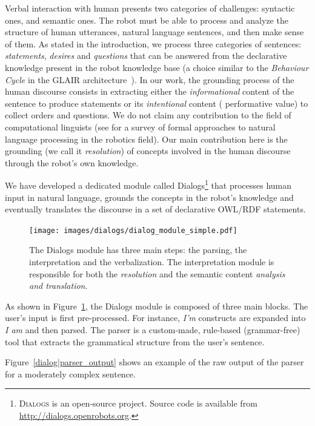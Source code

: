 Verbal interaction with human presents two categories of challenges: syntactic
ones, and semantic ones. The robot must be able to process and analyze the
structure of human utterances, \ie natural language sentences, and then make
sense of them. As stated in the introduction, we process three categories of
sentences: \emph{statements}, \emph{desires} and \emph{questions} that can be
answered from the declarative knowledge present in the robot knowledge base (a
choice similar to the \emph{Behaviour Cycle} in the GLAIR
architecture~\cite{Shapiro2009}). In our work, the grounding process of the
human discourse consists in extracting either the \emph{informational} content
of the sentence to produce statements or its \emph{intentional} content (\ie
performative value) to collect orders and questions. We do not claim any
contribution to the field of computational linguists (see \cite{Kruijff2010}
for a survey of formal approaches to natural language processing in the
robotics field). Our main contribution here is the grounding (we call it
\emph{resolution}) of concepts involved in the human discourse through the
robot's own knowledge.

We have developed a dedicated module called {\sc
Dialogs}\footnote{\textsc{Dialogs} is an open-source project. Source code is
available from \url{http://dialogs.openrobots.org}.} that processes human
input in natural language, grounds the concepts in the robot's knowledge and
eventually translates the discourse in a set of declarative OWL/RDF statements.

\begin{figure}[!ht]
\centering
  \texttt{[image: images/dialogs/dialog\_module\_simple.pdf]}
  \caption{The {\sc Dialogs} module has three main steps: the parsing,
  the interpretation and the verbalization. The interpretation module is
  responsible for both the \emph{resolution} and the semantic content
  \emph{analysis and translation}.} 
  \label{fig|dialog}
\end{figure}

As shown in Figure~\ref{fig|dialog}, the {\sc Dialogs} module is composed of
three main blocks. The user's input is first pre-processed. For instance,
\emph{I'm} constructs are expanded into \emph{I am} and then parsed. The parser
is a custom-made, rule-based (\ie grammar-free) tool that extracts the
grammatical structure from the user's sentence.

Figure~\ref{dialog|parser_output} shows an example of the raw output of the
parser for a moderately complex sentence.

